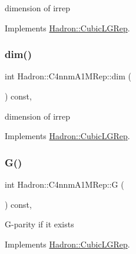 dimension of irrep 

Implements \mbox{\hyperlink{structHadron_1_1CubicLGRep_a3acbaea26503ed64f20df693a48e4cdd}{Hadron\+::\+Cubic\+L\+G\+Rep}}.

\mbox{\label{structHadron_1_1C4nnmA1MRep_afb797b4baebc8d261c96fd1f173825b6}} 
\subsubsection{\texorpdfstring{dim()}{dim()}\hspace{0.1cm}{\footnotesize\ttfamily [2/2]}}
{\footnotesize\ttfamily int Hadron\+::\+C4nnm\+A1\+M\+Rep\+::dim (\begin{DoxyParamCaption}{ }\end{DoxyParamCaption}) const\hspace{0.3cm}{\ttfamily [inline]}, {\ttfamily [virtual]}}

dimension of irrep 

Implements \mbox{\hyperlink{structHadron_1_1CubicLGRep_a3acbaea26503ed64f20df693a48e4cdd}{Hadron\+::\+Cubic\+L\+G\+Rep}}.

\mbox{\label{structHadron_1_1C4nnmA1MRep_a80fdc5fe56a8c2c040f46f97a4bee86a}} 
\subsubsection{\texorpdfstring{G()}{G()}\hspace{0.1cm}{\footnotesize\ttfamily [1/2]}}
{\footnotesize\ttfamily int Hadron\+::\+C4nnm\+A1\+M\+Rep\+::G (\begin{DoxyParamCaption}{ }\end{DoxyParamCaption}) const\hspace{0.3cm}{\ttfamily [inline]}, {\ttfamily [virtual]}}

G-\/parity if it exists 

Implements \mbox{\hyperlink{structHadron_1_1CubicLGRep_ace26f7b2d55e3a668a14cb9026da5231}{Hadron\+::\+Cubic\+L\+G\+Rep}}.

\mbox{\label{structHadron_1_1C4nnmA1MRep_a80fdc5fe56a8c2c040f46f97a4bee86a}} 
